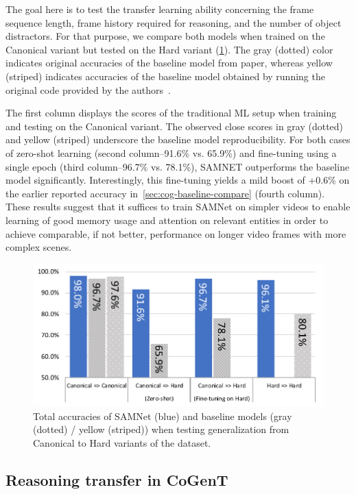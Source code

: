 The goal here is to test the transfer learning ability concerning the frame sequence length, frame history required for reasoning, and the number of object distractors.
For that purpose, we compare both models when trained on the Canonical variant but tested on the Hard variant (\cref{fig:samnet_cog_overall_transfer}).
The gray (dotted) color indicates original accuracies of the baseline model from paper,
whereas yellow (striped) indicates accuracies of the baseline model obtained by running the original code provided by the authors~\cite{yang2018implement}.

The first column displays the scores of the traditional ML setup when training and testing on the Canonical variant.
The observed close scores in gray (dotted) and yellow (striped) underscore the baseline model reproducibility.
For both cases of zero-shot learning (second column--91.6\% vs. 65.9\%) and fine-tuning using a single epoch (third column--96.7\% vs. 78.1\%), SAMNET outperforms the baseline model significantly.
Interestingly, this fine-tuning yields a mild boost of +0.6\% on the earlier reported accuracy in~\cref{sec:cog-baseline-compare} (fourth column).
These results suggest that it suffices to train SAMNet on simpler videos to enable learning of good memory usage and attention on relevant entities in order to achieve comparable, if not better, performance on longer video frames with more complex scenes.

\begin{figure}[htbp]
	\centering
	\includegraphics[width=\columnwidth]{../img/plots/cog_temporal_transfer_baselines.pdf}
	\caption{Total accuracies of SAMNet (blue) and baseline models (gray (dotted) / yellow (striped)) when testing generalization from Canonical to Hard variants of the dataset.}
	\label{fig:samnet_cog_overall_transfer}
\end{figure}


\subsection{Reasoning transfer in CoGenT}
\label{sec:reasoning-clevr}

